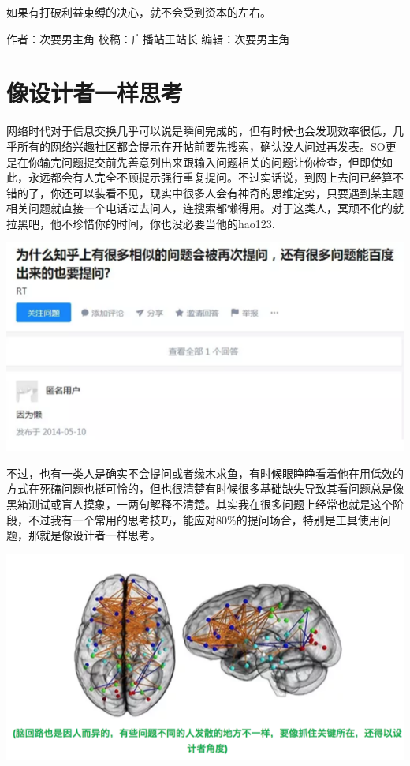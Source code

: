 \documentclass[
]{book}
\begin{document}
如果有打破利益束缚的决心，就不会受到资本的左右。

作者：次要男主角
校稿：广播站王站长
编辑：次要男主角

\hypertarget{ux50cfux8bbeux8ba1ux8005ux4e00ux6837ux601dux8003}{%
\section{像设计者一样思考}\label{ux50cfux8bbeux8ba1ux8005ux4e00ux6837ux601dux8003}}

网络时代对于信息交换几乎可以说是瞬间完成的，但有时候也会发现效率很低，几乎所有的网络兴趣社区都会提示在开帖前要先搜索，确认没人问过再发表。SO更是在你输完问题提交前先善意列出来跟输入问题相关的问题让你检查，但即使如此，永远都会有人完全不顾提示强行重复提问。不过实话说，到网上去问已经算不错的了，你还可以装看不见，现实中很多人会有神奇的思维定势，只要遇到某主题相关问题就直接一个电话过去问人，连搜索都懒得用。对于这类人，冥顽不化的就拉黑吧，他不珍惜你的时间，你也没必要当他的hao123.

\includegraphics[width=8.33in]{images/sheji1}

不过，也有一类人是确实不会提问或者缘木求鱼，有时候眼睁睁看着他在用低效的方式在死磕问题也挺可怜的，但也很清楚有时候很多基础缺失导致其看问题总是像黑箱测试或盲人摸象，一两句解释不清楚。其实我在很多问题上经常也就是这个阶段，不过我有一个常用的思考技巧，能应对80\%的提问场合，特别是工具使用问题，那就是像设计者一样思考。

\includegraphics[width=8.33in]{images/sheji2}
\end{document}
